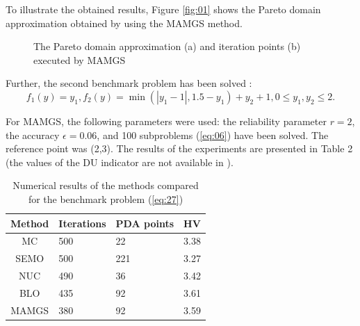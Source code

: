 \documentclass[smallcondensed]{svjour3}     %
\begin{document}
To illustrate the obtained results, Figure \ref{fig:01} shows the Pareto domain approximation obtained by using the MAMGS method.

\begin{figure}
\caption{The Pareto domain approximation (a) and iteration points (b) executed by MAMGS}
\label{fig:02}
\end{figure}

Further, the second benchmark problem has been solved \cite{c10}:
\begin{equation}\label{eq:27}
f_1 (y)=y_1, f_2 (y)=\min {( |y_1-1|,1.5-y_1)}+y_2+1, 0 \leq y_1,y_2 \leq 2.
\end{equation}

For MAMGS, the following parameters were used: the reliability parameter $r=2$, the accuracy $\epsilon = 0.06$, and 100 subproblems (\ref{eq:06}) have been solved. The reference point was (2,3).
The results of the experiments are presented in Table 2 (the values of the DU indicator are not available in \cite{c10,c45}). 

\begin{table}[t]
\centering
\caption{Numerical results of the methods compared for the benchmark problem (\ref{eq:27})}
\label{tab:02}
\begin{tabular}{clll}
\hline
\textbf{Method} & \textbf{Iterations} & \textbf{PDA points} & \textbf{HV} \\ \hline
MC              & 500                 & 22                  & 3.38        \\
SEMO            & 500                 & 221                 & 3.27        \\
NUC             & 490                 & 36                  & 3.42        \\
BLO             & 435                 & 92                  & 3.61        \\
MAMGS           & 380                 & 92                  & 3.59        \\ \hline
\end{tabular}
\end{table}
\end{document}
